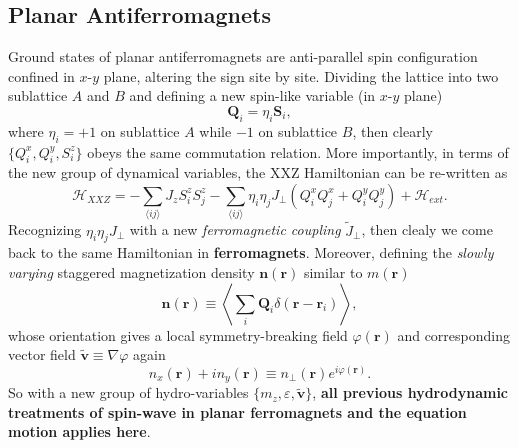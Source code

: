 \documentclass[10pt,nofootinbib]{revtex4}
\begin{document}
	\subsection{Planar Antiferromagnets}
		Ground states of planar antiferromagnets are anti-parallel spin configuration confined in $x$-$y$ plane, altering the sign site by site. Dividing the lattice into two sublattice $A$ and $B$ and defining a new spin-like variable (in $x$-$y$ plane)
		\begin{equation*}
			\bm{Q}_i=\eta_{i}\bm{S}_i,
		\end{equation*}
		where $\eta_i=+1$ on sublattice $A$ while $-1$ on sublattice $B$, then clearly $\{Q_i^x,Q_i^y,S_i^z\}$ obeys the same commutation relation. More importantly, in terms of the new group of dynamical variables, the XXZ Hamiltonian can be re-written as
		\begin{equation}\label{2.4.1}
			\mathcal{H}_{XXZ}=-\sum_{\langle ij\rangle}J_z S_i^z S_j^z-\sum_{\langle ij\rangle}\eta_i\eta_j J_\perp(Q_i^x Q_j^x+Q_i^y Q_j^y)+\mathcal{H}_{ext}.
		\end{equation}
		Recognizing $\eta_i\eta_j J_\perp$ with a new \emph{ferromagnetic coupling} $\widetilde{J}_\perp$, then clealy we come back to the same Hamiltonian in \textbf{ferromagnets}. Moreover, defining the \emph{slowly varying} staggered magnetization density $\bm{n}(\bm{r})$ similar to $m(\bm{r})$
		\begin{equation}\label{2.4.2}
			\bm{n}(\bm{r})\equiv\left\langle\sum_i\bm{Q}_i\delta(\bm{r}-\bm{r}_i)\right\rangle,
		\end{equation}
		whose orientation gives a local symmetry-breaking field $\varphi(\bm{r})$  and corresponding vector field $\widetilde{\bm{v}}\equiv\nabla\varphi$ again
		\begin{equation}\label{2.4.3}
			n_x(\bm{r})+in_y(\bm{r})\equiv n_\perp(\bm{r})e^{i\varphi(\bm{r})}.
		\end{equation}
		So with a new group of hydro-variables $\{m_z,\varepsilon,\widetilde{\bm{v}}\}$, \textbf{\color{red}all previous hydrodynamic treatments of spin-wave in planar ferromagnets and the equation motion applies here}.
\end{document}
